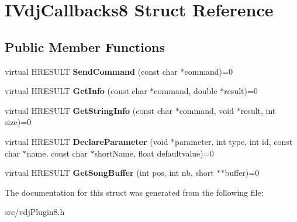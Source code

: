 \hypertarget{structIVdjCallbacks8}{}\section{I\+Vdj\+Callbacks8 Struct Reference}
\label{structIVdjCallbacks8}
\subsection*{Public Member Functions}
\begin{DoxyCompactItemize}
\item 
\mbox{\label{structIVdjCallbacks8_a82e20361953da177f739ed6cf55b47ed}} 
virtual H\+R\+E\+S\+U\+LT {\bfseries Send\+Command} (const char $\ast$command)=0
\item 
\mbox{\label{structIVdjCallbacks8_a73e317136b0fb53187c2bc41b7845403}} 
virtual H\+R\+E\+S\+U\+LT {\bfseries Get\+Info} (const char $\ast$command, double $\ast$result)=0
\item 
\mbox{\label{structIVdjCallbacks8_a1136c2b7dcc7ce42a9f67d741cb37bcb}} 
virtual H\+R\+E\+S\+U\+LT {\bfseries Get\+String\+Info} (const char $\ast$command, void $\ast$result, int size)=0
\item 
\mbox{\label{structIVdjCallbacks8_a5fdc3c99d9efdbaf368ff1146e134a57}} 
virtual H\+R\+E\+S\+U\+LT {\bfseries Declare\+Parameter} (void $\ast$parameter, int type, int id, const char $\ast$name, const char $\ast$short\+Name, float defaultvalue)=0
\item 
\mbox{\label{structIVdjCallbacks8_a1f52f10cf707d4e8946a966e2ab7de8d}} 
virtual H\+R\+E\+S\+U\+LT {\bfseries Get\+Song\+Buffer} (int pos, int nb, short $\ast$$\ast$buffer)=0
\end{DoxyCompactItemize}


The documentation for this struct was generated from the following file\+:\begin{DoxyCompactItemize}
\item 
src/vdj\+Plugin8.\+h\end{DoxyCompactItemize}

